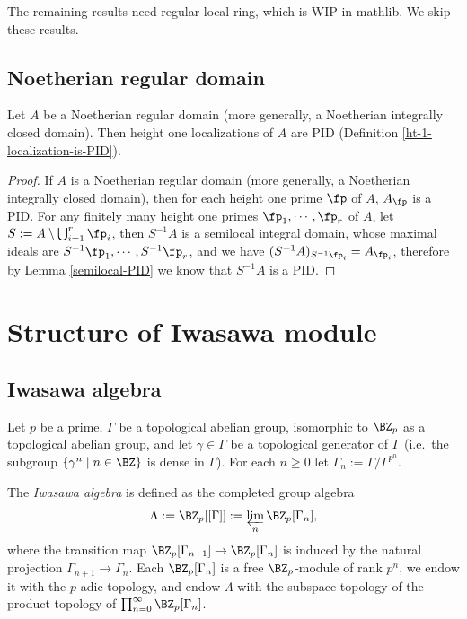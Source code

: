 The remaining results need regular local ring,
which is WIP in mathlib. We skip these results.

\subsection{Noetherian regular domain}

\begin{prop}
\label{regular-domain-is-good}
\leanok
{}
Let $A$ be a Noetherian regular domain
(more generally, a Noetherian integrally closed domain).
Then height one localizations of $A$ are PID
(Definition \ref{ht-1-localization-is-PID}).
\end{prop}

\begin{proof}
\leanok
If $A$ is a Noetherian regular domain
(more generally, a Noetherian integrally closed domain),
then for each height one prime $\fp$ of $A$,
$A_\fp$ is a PID.
For any finitely many height one primes $\fp_1,\cdots,\fp_r$ of $A$,
let $S:=A\setminus\bigcup_{i=1}^r\fp_i$,
then $S^{-1}A$ is a semilocal integral domain, whose
maximal ideals are $S^{-1}\fp_1,\cdots,S^{-1}\fp_r$,
and we have $(S^{-1}A)_{S^{-1}\fp_i}=A_{\fp_i}$,
therefore by Lemma \ref{semilocal-PID} we know that $S^{-1}A$ is a PID.
\end{proof}

\section{Structure of Iwasawa module}

\subsection{Iwasawa algebra}

Let $p$ be a prime,
$\Gamma$ be a topological abelian group, isomorphic to $\BZ_p$
as a topological abelian group, and let $\gamma\in\Gamma$ be a topological generator
of $\Gamma$ (i.e.~the subgroup $\{\gamma^n\mid n\in\BZ\}$ is dense in $\Gamma$).
For each $n\geq 0$ let $\Gamma_n:=\Gamma/\Gamma^{p^n}$.

\begin{definition}
\label{Iwasawa-alg-defn}
The \emph{Iwasawa algebra} is defined as the completed group algebra
$$
\Lambda:=\BZ_p[[\Gamma]]:=\varprojlim_n\BZ_p[\Gamma_n],
$$
where the transition map $\BZ_p[\Gamma_{n+1}]\to
\BZ_p[\Gamma_n]$ is induced by the natural projection
$\Gamma_{n+1}\to\Gamma_n$.
Each $\BZ_p[\Gamma_n]$ is a free $\BZ_p$-module of rank $p^n$,
we endow it with the $p$-adic topology,
and endow $\Lambda$ with the subspace topology
of the product topology of $\prod_{n=0}^\infty\BZ_p[\Gamma_n]$.
\end{definition}

